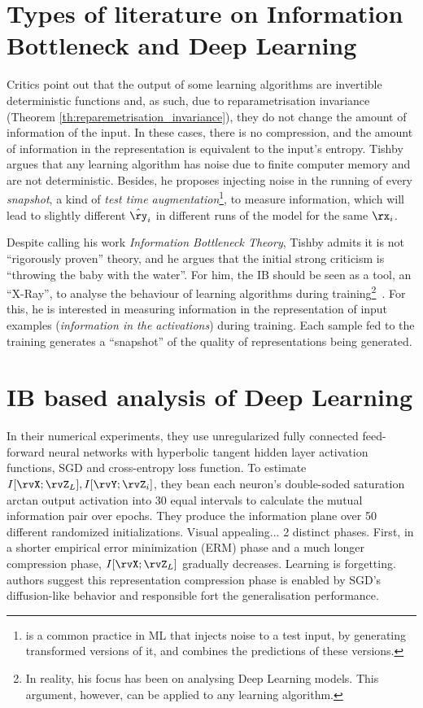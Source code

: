\section{Types of literature on Information Bottleneck and Deep Learning}
Critics point out that the output of some learning algorithms are invertible deterministic functions and, as such, due to reparametrisation invariance (Theorem \ref{th:reparemetrisation_invariance}), they do not change the amount of information of the input. In these cases, there is no compression, and the amount of information in the representation is equivalent to the input's entropy. Tishby argues that any learning algorithm has noise due to finite computer memory and are not deterministic. Besides, he proposes injecting noise in the running of every \emph{snapshot}, a kind of \emph{test time augmentation}\footnote{ is a common practice in ML that injects noise to a test input, by generating transformed versions of it, and combines the predictions of these versions.}, to measure information, which will lead to slightly different $\hat{\ry}_i$  in different runs of the model for the same $\rx_i$.


Despite calling his work \emph{Information Bottleneck Theory}, Tishby admits it is not ``rigorously proven'' theory, and he argues that the initial strong criticism is ``throwing the baby with the water''. For him, the IB should be seen as a tool, an ``X-Ray'', to analyse the behaviour of learning algorithms during training\footnote{In reality, his focus has been on analysing Deep Learning models.  This argument, however, can be applied to any learning algorithm.}~\cite{tishby:2020DeepMath}. For this, he is interested in measuring information in the representation of {input examples} (\emph{information in the activations}) during training. Each sample fed to the training generates a ``snapshot'' of the quality of representations being generated.


\section{IB based analysis of Deep Learning}
In their numerical experiments\cite{shwartz-ziv:2017}, they use unregularized fully connected feed-forward neural networks with hyperbolic tangent hidden layer activation functions, SGD and cross-entropy loss function. To estimate $I[\rvX;\rvZ_L], I[\rvY;\rvZ_i]$, they bean each neuron's double-soded saturation arctan output activation into 30 equal intervals to calculate the mutual information pair over epochs. They produce the information plane over 50 different randomized initializations.  Visual appealing... 2 distinct phases. First, in a shorter empirical error minimization (ERM) phase and a much longer compression phase, $I[\rvX;\rvZ_L]$ gradually decreases. Learning is forgetting. authors suggest this representation compression phase is enabled by SGD's diffusion-like behavior and responsible fort the generalisation performance.
